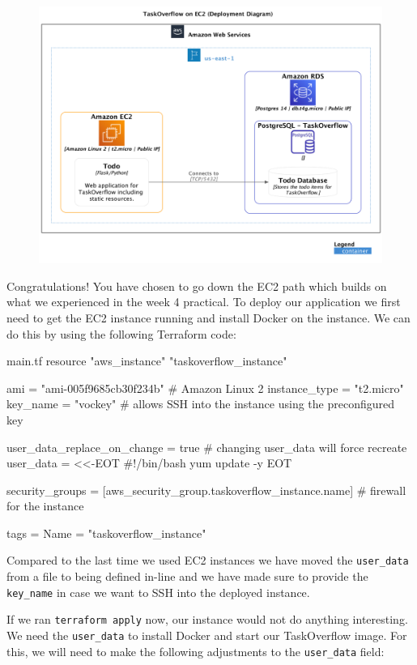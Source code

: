 \documentclass{csse4400}
\begin{document}
\begin{figure}[H]
  \includegraphics[width=\textwidth]{diagrams/ec2deployment}
\end{figure}

Congratulations! You have chosen to go down the EC2 path which builds on what we experienced in the week 4 practical.
To deploy our application we first need to get the EC2 instance running and install Docker on the instance.
We can do this by using the following Terraform code:

\begin{code}[language=terraform,numbers=none]{main.tf}
resource "aws_instance" "taskoverflow_instance" {
    ami           = "ami-005f9685cb30f234b" # Amazon Linux 2
    instance_type = "t2.micro"
    key_name      = "vockey" # allows SSH into the instance using the preconfigured key
    
    user_data_replace_on_change = true # changing user_data will force recreate
    user_data                   = <<-EOT
#!/bin/bash
yum update -y
    EOT
  
    security_groups = [aws_security_group.taskoverflow_instance.name] # firewall for the instance

    tags = {
        Name = "taskoverflow_instance"
    }
}
\end{code}

Compared to the last time we used EC2 instances we have moved the \texttt{user\_data} from a file to being defined in-line and we have made sure to provide the \texttt{key\_name} in case we want to SSH into the deployed instance.

If we ran \texttt{terraform apply} now, our instance would not do anything interesting.
We need the \texttt{user\_data} to install Docker and start our TaskOverflow image.
For this, we will need to make the following adjustments to the \texttt{user\_data} field:
\end{document}
